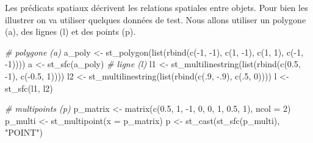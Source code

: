 \documentclass[
]{book}
\newenvironment{Shaded}{\begin{snugshade}}{\end{snugshade}}
\newcommand{\AttributeTok}[1]{\textcolor[rgb]{0.77,0.63,0.00}{#1}}
\newcommand{\CommentTok}[1]{\textcolor[rgb]{0.56,0.35,0.01}{\textit{#1}}}
\newcommand{\DecValTok}[1]{\textcolor[rgb]{0.00,0.00,0.81}{#1}}
\newcommand{\FloatTok}[1]{\textcolor[rgb]{0.00,0.00,0.81}{#1}}
\newcommand{\FunctionTok}[1]{\textcolor[rgb]{0.00,0.00,0.00}{#1}}
\newcommand{\NormalTok}[1]{#1}
\newcommand{\OtherTok}[1]{\textcolor[rgb]{0.56,0.35,0.01}{#1}}
\newcommand{\SpecialCharTok}[1]{\textcolor[rgb]{0.00,0.00,0.00}{#1}}
\newcommand{\StringTok}[1]{\textcolor[rgb]{0.31,0.60,0.02}{#1}}
\begin{document}
Les prédicats spatiaux décrivent les relations spatiales entre objets. Pour bien les illustrer on va utiliser quelques données de test.
Nous allons utiliser un polygone (a), des lignes (l) et des points (p).

\begin{Shaded}
\begin{Highlighting}[]
\CommentTok{\# polygone (a)}
\NormalTok{a\_poly }\OtherTok{\textless{}{-}} \FunctionTok{st\_polygon}\NormalTok{(}\FunctionTok{list}\NormalTok{(}\FunctionTok{rbind}\NormalTok{(}\FunctionTok{c}\NormalTok{(}\SpecialCharTok{{-}}\DecValTok{1}\NormalTok{, }\SpecialCharTok{{-}}\DecValTok{1}\NormalTok{), }\FunctionTok{c}\NormalTok{(}\DecValTok{1}\NormalTok{, }\SpecialCharTok{{-}}\DecValTok{1}\NormalTok{), }\FunctionTok{c}\NormalTok{(}\DecValTok{1}\NormalTok{, }\DecValTok{1}\NormalTok{), }\FunctionTok{c}\NormalTok{(}\SpecialCharTok{{-}}\DecValTok{1}\NormalTok{, }\SpecialCharTok{{-}}\DecValTok{1}\NormalTok{))))}
\NormalTok{a }\OtherTok{\textless{}{-}} \FunctionTok{st\_sfc}\NormalTok{(a\_poly)}
\CommentTok{\# ligne (l)}
\NormalTok{l1 }\OtherTok{\textless{}{-}} \FunctionTok{st\_multilinestring}\NormalTok{(}\FunctionTok{list}\NormalTok{(}\FunctionTok{rbind}\NormalTok{(}\FunctionTok{c}\NormalTok{(}\FloatTok{0.5}\NormalTok{, }\SpecialCharTok{{-}}\DecValTok{1}\NormalTok{), }\FunctionTok{c}\NormalTok{(}\SpecialCharTok{{-}}\FloatTok{0.5}\NormalTok{, }\DecValTok{1}\NormalTok{))))}
\NormalTok{l2 }\OtherTok{\textless{}{-}} \FunctionTok{st\_multilinestring}\NormalTok{(}\FunctionTok{list}\NormalTok{(}\FunctionTok{rbind}\NormalTok{(}\FunctionTok{c}\NormalTok{(.}\DecValTok{9}\NormalTok{, }\SpecialCharTok{{-}}\NormalTok{.}\DecValTok{9}\NormalTok{), }\FunctionTok{c}\NormalTok{(.}\DecValTok{5}\NormalTok{, }\DecValTok{0}\NormalTok{))))}
\NormalTok{l }\OtherTok{\textless{}{-}} \FunctionTok{st\_sfc}\NormalTok{(l1, l2)}

\CommentTok{\# multipoints (p)}
\NormalTok{p\_matrix }\OtherTok{\textless{}{-}} \FunctionTok{matrix}\NormalTok{(}\FunctionTok{c}\NormalTok{(}\FloatTok{0.5}\NormalTok{, }\DecValTok{1}\NormalTok{, }\SpecialCharTok{{-}}\DecValTok{1}\NormalTok{, }\DecValTok{0}\NormalTok{, }\DecValTok{0}\NormalTok{, }\DecValTok{1}\NormalTok{, }\FloatTok{0.5}\NormalTok{, }\DecValTok{1}\NormalTok{), }\AttributeTok{ncol =} \DecValTok{2}\NormalTok{)}
\NormalTok{p\_multi }\OtherTok{\textless{}{-}} \FunctionTok{st\_multipoint}\NormalTok{(}\AttributeTok{x =}\NormalTok{ p\_matrix)}
\NormalTok{p }\OtherTok{\textless{}{-}} \FunctionTok{st\_cast}\NormalTok{(}\FunctionTok{st\_sfc}\NormalTok{(p\_multi), }\StringTok{"POINT"}\NormalTok{)}
\end{Highlighting}
\end{Shaded}
\end{document}

